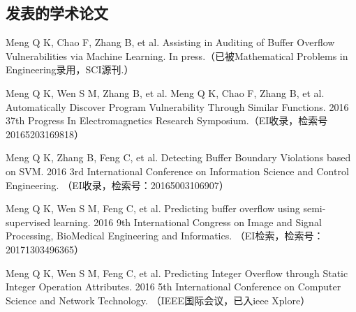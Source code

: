 \begin{resume}

  \section*{发表的学术论文} %

  \begin{enumerate}[{[}1{]}]
  \item Meng Q K, Chao F, Zhang B, et al. Assisting in Auditing of Buffer Overflow Vulnerabilities via Machine Learning. In press.（已被Mathematical Problems in Engineering录用，SCI源刊.）
  
  \item Meng Q K, Wen S M, Zhang B, et al. Meng Q K, Chao F, Zhang B, et al.  Automatically Discover Program Vulnerability Through Similar Functions. 2016 37th Progress In Electromagnetics Research Symposium.（EI收录，检索号20165203169818）
  
  \item Meng Q K, Zhang B, Feng C, et al. Detecting Buffer Boundary Violations based on SVM. 2016 3rd International Conference on Information Science and Control Engineering. （EI收录，检索号：20165003106907）
  
  \item Meng Q K, Wen S M, Feng C, et al. Predicting buffer overflow using semi-supervised
  learning. 2016 9th International Congress on Image and Signal Processing, BioMedical Engineering and Informatics. （EI检索，检索号：20171303496365）
  
  \item Meng Q K, Wen S M, Feng C, et al. Predicting Integer Overflow through Static Integer Operation Attributes. 2016 5th International Conference on Computer Science and Network Technology. （IEEE国际会议，已入ieee Xplore）
  
  \end{enumerate}

\end{resume}
